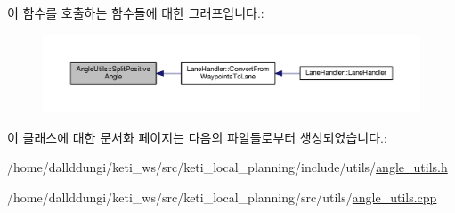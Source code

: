이 함수를 호출하는 함수들에 대한 그래프입니다.\+:\nopagebreak
\begin{figure}[H]
\begin{center}
\leavevmode
\includegraphics[width=350pt]{class_angle_utils_a91f3e34c9e1e35788d44a2f6bc5bc206_icgraph}
\end{center}
\end{figure}




이 클래스에 대한 문서화 페이지는 다음의 파일들로부터 생성되었습니다.\+:\begin{DoxyCompactItemize}
\item 
/home/dallddungi/keti\+\_\+ws/src/keti\+\_\+local\+\_\+planning/include/utils/\hyperlink{angle__utils_8h}{angle\+\_\+utils.\+h}\item 
/home/dallddungi/keti\+\_\+ws/src/keti\+\_\+local\+\_\+planning/src/utils/\hyperlink{angle__utils_8cpp}{angle\+\_\+utils.\+cpp}\end{DoxyCompactItemize}
